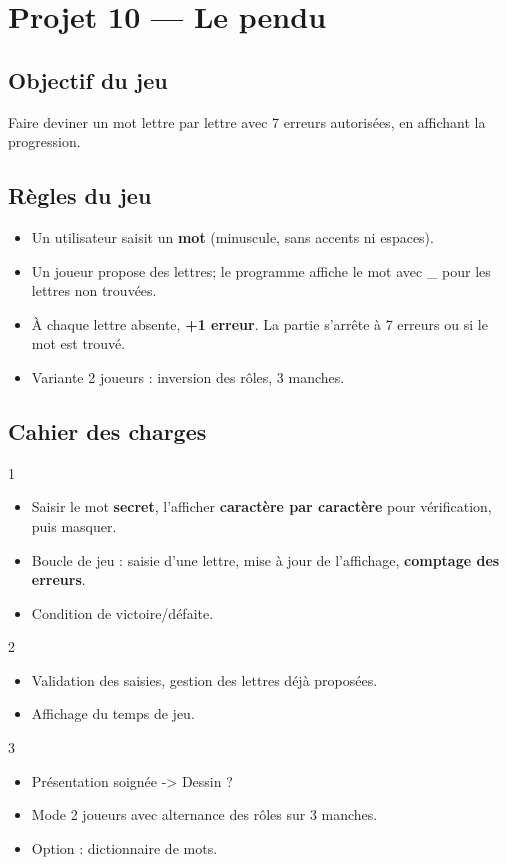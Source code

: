 \section{Projet 10 — Le pendu}

\subsection*{Objectif du jeu}
Faire deviner un mot lettre par lettre avec 7 erreurs autorisées, en affichant la progression.

\subsection*{Règles du jeu}
\begin{itemize}
  \item Un utilisateur saisit un \textbf{mot} (minuscule, sans accents ni espaces).
  \item Un joueur propose des lettres; le programme affiche le mot avec \_ pour les lettres non trouvées.
  \item À chaque lettre absente, \textbf{+1 erreur}. La partie s’arrête à 7 erreurs ou si le mot est trouvé.
  \item Variante 2 joueurs : inversion des rôles, 3 manches.
\end{itemize}

\subsection*{Cahier des charges}
\begin{UPSTICahierDesCharges}{1}
\begin{itemize}
  \item Saisir le mot \textbf{secret}, l’afficher \textbf{caractère par caractère} pour vérification, puis masquer.
  \item Boucle de jeu : saisie d’une lettre, mise à jour de l’affichage, \textbf{comptage des erreurs}.
  \item Condition de victoire/défaite.
\end{itemize}
\end{UPSTICahierDesCharges}

\begin{UPSTICahierDesCharges}{2}
\begin{itemize}
  \item Validation des saisies, gestion des lettres déjà proposées.
  \item Affichage du temps de jeu.
\end{itemize}
\end{UPSTICahierDesCharges}

\begin{UPSTICahierDesCharges}{3}
\begin{itemize}
  \item Présentation soignée -> Dessin ?
  \item Mode 2 joueurs avec alternance des rôles sur 3 manches.
  \item Option : dictionnaire de mots.
\end{itemize}
\end{UPSTICahierDesCharges}

